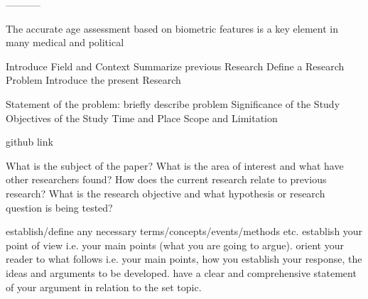 -----------

The accurate age assessment based on biometric features is a key element in many medical and political

Introduce Field and Context
Summarize previous Research
Define a Research Problem
Introduce the present Research

Statement of the problem: briefly describe problem
Significance of the Study
Objectives of the Study
Time and Place
Scope and Limitation

github link

What is the subject of the paper?
What is the area of interest and what have other researchers found?
How does the current research relate to previous research?
What is the research objective and what hypothesis or research question is being tested?

establish/define any necessary terms/concepts/events/methods etc.
establish your point of view i.e. your main points (what you are going to argue).
orient your reader to what follows i.e. your main points, how you establish your response, the ideas and arguments to be developed.
have a clear and comprehensive statement of your argument in relation to the set topic.

\newpage
